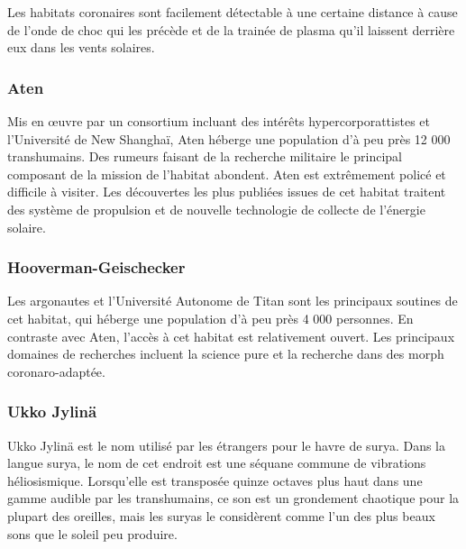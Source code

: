                                                       Les habitats coronaires sont facilement détectable à une certaine distance à cause de l'onde de choc qui les précède et de la trainée de plasma qu'il laissent derrière eux dans les vents solaires. 

                                                      \subsubsection{Aten} \label{sec:aten} 

                                                      Mis en œuvre par un consortium incluant des intérêts hypercorporattistes et l'Université de New Shanghaï, Aten héberge une population d'à peu près 12 000 transhumains. Des rumeurs faisant de la recherche militaire le principal composant de la mission de l'habitat abondent. Aten est extrêmement policé et difficile à visiter. Les découvertes les plus publiées issues de cet habitat traitent des système de propulsion et de nouvelle technologie de collecte de l'énergie solaire. 

                                                      \subsubsection{Hooverman-Geischecker} \label{sec:hoov-geisch} 

                                                      Les argonautes et l'Université Autonome de Titan sont les principaux soutines de cet habitat, qui héberge une population d'à peu près 4 000 personnes. En contraste avec Aten, l'accès à cet habitat est relativement ouvert. Les principaux domaines de recherches incluent la science pure et la recherche dans des morph coronaro-adaptée. 

                                                      \subsubsection{Ukko Jylinä} \label{sec:ukko-jylina} 

                                                      Ukko Jylinä est le nom utilisé par les étrangers pour le havre de surya. Dans la langue surya, le nom de cet endroit est une séquane commune de vibrations héliosismique. Lorsqu'elle est transposée quinze octaves plus haut dans une gamme audible par les transhumains, ce son est un grondement chaotique pour la plupart des oreilles, mais les suryas le considèrent comme l'un des plus beaux sons que le soleil peu produire. 

